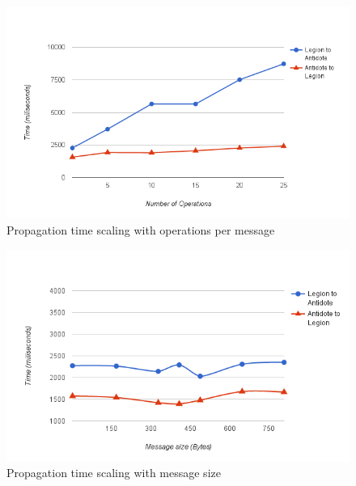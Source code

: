 \begin{figure}[H]
\centering
\includegraphics[scale=0.7]{files/graph1.png}
\caption{Propagation time scaling with operations per message}
\label{graph1}
\end{figure}

\begin{figure}[H]
\centering
\includegraphics[scale=0.7]{files/chart2.png}
\caption{Propagation time scaling with message size}
\label{chart2}
\end{figure}

